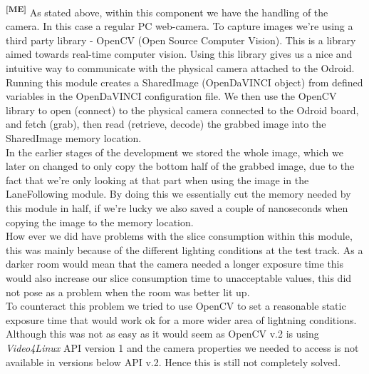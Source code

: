 \noindent
\textsuperscript{\textbf{[ME]}}
As stated above, within this component we have the handling of the camera. In
this case a regular PC web-camera. To capture images we're using a third party
library - OpenCV (Open Source Computer Vision). This is a library aimed towards
real-time computer vision. Using this library gives us a nice and intuitive way
to communicate with the physical camera attached to the Odroid.\\
Running this module creates a SharedImage (OpenDaVINCI object) from defined
variables in the OpenDaVINCI configuration file. We then use the OpenCV library
to open (connect) to the physical camera connected to the Odroid board, and
fetch (grab), then read (retrieve, decode) the grabbed image into the
SharedImage memory location.\\
In the earlier stages of the development we stored the whole image, which we
later on changed to only copy the bottom half of the grabbed image, due to the
fact that we're only looking at that part when using the image in the
LaneFollowing module. By doing this we essentially cut the memory needed by this
module in half, if we're lucky we also saved a couple of nanoseconds when
copying the image to the memory location.\\
How ever we did have problems with the slice consumption within this module,
this was mainly because of the different lighting conditions at the test track.
As a darker room would mean that the camera needed a longer exposure time this
would also increase our slice consumption time to unacceptable values, this did
not pose as a problem when the room was better lit up.\\
To counteract this problem we tried to use OpenCV to set a reasonable static
exposure time that would work ok for a more wider area of lightning conditions.
Although this was not as easy as it would seem as OpenCV v.2 is using
\textit{Video4Linux} API version 1 and the camera properties we needed to access
is not available in versions below API v.2. Hence this is still not completely
solved.\\

